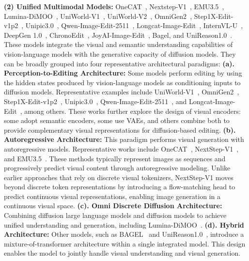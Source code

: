 \hspace*{1em} \noindent\textbf{(2) Unified Multimodal Models:} OneCAT~\cite{li2025onecat}, 
Nextstep-V1~\cite{han2025nextstep}, EMU3.5~\cite{cui2025emu3}, Lumina-DiMOO~\cite{xin2025lumina}, UniWorld-V1~\cite{lin2025uniworld}, 
UniWorld-V2~\cite{li2025uniworld},
OmniGen2~\cite{wu2025omnigen2}, Step1X-Edit-v1p2~\cite{liu2025step1x}, Unipic3.0~\cite{wei2026skywork}, Qwen-Image-Edit-2511~\cite{wu2025qwen}, Longcat-Image-Edit~\cite{team2025longcat}, InternVL-U~\cite{tian2026internvl}, DeepGen 1.0~\cite{wang2026deepgen}, ChronoEdit~\cite{wu2025chronoedit},  JoyAI-Image-Edit~\cite{joyaiimage2026}, Bagel\cite{deng2025emerging}, and UniReason1.0~\cite{wang2026unireason}. These models integrate the visual and semantic understanding capabilities of vision-language models with the generative capacity of diffusion models. They can be broadly grouped into four representative architectural paradigms: 
\textbf{(a). Perception-to-Editing Architecture: } Some models perform editing by using the hidden states produced by vision-language models as conditioning inputs to diffusion models. Representative examples include UniWorld-V1~\cite{lin2025uniworld}, OmniGen2~\cite{wu2025omnigen2}, Step1X-Edit-v1p2~\cite{liu2025step1x}, Unipic3.0~\cite{wei2026skywork}, Qwen-Image-Edit-2511~\cite{wu2025qwen}, and Longcat-Image-Edit~\cite{team2025longcat}, among others. These works further explore the design of visual encoders: some adopt semantic encoders, some use VAEs, and others combine both to provide complementary visual representations for diffusion-based editing. \textbf{(b). Autoregressive Architecture:} This paradigm performs visual generation with autoregressive models. Representative works include OneCAT~\cite{li2025onecat}, NextStep-V1~\cite{han2025nextstep}, and EMU3.5~\cite{cui2025emu3}. These methods typically represent images as sequences and progressively predict visual content through autoregressive modeling. Unlike earlier approaches that rely on discrete visual tokenizers, NextStep-V1 moves beyond discrete token representations by introducing a flow-matching head to predict continuous visual representations, enabling image generation in a continuous visual space.
\textbf{(c). Omni Discrete Diffusion Architecture:} Combining diffusion large language models and diffusion models to achieve unified understanding and generation, including Lumina-DiMOO~\cite{xin2025lumina}.
\textbf{(d). Hybrid Architecture:} Other models, such as BAGEL~\cite{deng2025emerging} and UniReason1.0~\cite{wang2026unireason}, introduce a mixture-of-transformer architecture within a single integrated model. This design enables the model to jointly handle visual understanding and visual generation.

